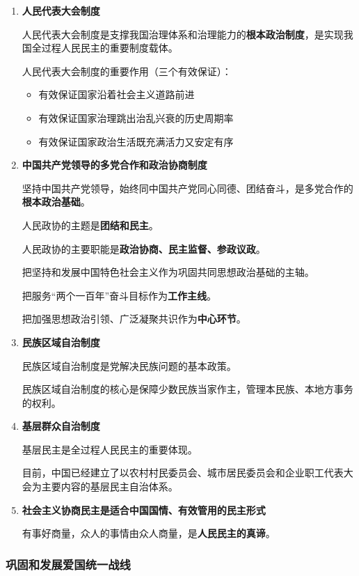 \documentclass[12pt, a4paper, oneside]{ctexart}
\begin{document}
\begin{enumerate}
  \item {\bf 人民代表大会制度}
  
  人民代表大会制度是支撑我国治理体系和治理能力的\textbf{根本政治制度}，是实现我国全过程人民民主的重要制度载体。

  人民代表大会制度的重要作用（三个有效保证）：
  \begin{itemize}
    \item 有效保证国家沿着社会主义道路前进
    \item 有效保证国家治理跳出治乱兴衰的历史周期率
    \item 有效保证国家政治生活既充满活力又安定有序
  \end{itemize}

  \item {\bf 中国共产党领导的多党合作和政治协商制度}
  
  坚持中国共产党领导，始终同中国共产党同心同德、团结奋斗，是多党合作的\textbf{根本政治基础}。

  人民政协的主题是\textbf{团结和民主}。

  人民政协的主要职能是\textbf{政治协商、民主监督、参政议政}。

  把坚持和发展中国特色社会主义作为巩固共同思想政治基础的主轴。

  把服务“两个一百年”奋斗目标作为\textbf{工作主线}。

  把加强思想政治引领、广泛凝聚共识作为\textbf{中心环节}。

  \item {\bf 民族区域自治制度}
  
  民族区域自治制度是党解决民族问题的基本政策。

  民族区域自治制度的核心是保障少数民族当家作主，管理本民族、本地方事务的权利。

  \item {\bf 基层群众自治制度}
  
  基层民主是全过程人民民主的重要体现。

  目前，中国已经建立了以农村村民委员会、城市居民委员会和企业职工代表大会为主要内容的基层民主自治体系。

  \item {\bf 社会主义协商民主是适合中国国情、有效管用的民主形式}
  
  有事好商量，众人的事情由众人商量，是\textbf{人民民主的真谛}。
\end{enumerate}

\subsubsection{巩固和发展爱国统一战线}
\end{document}

